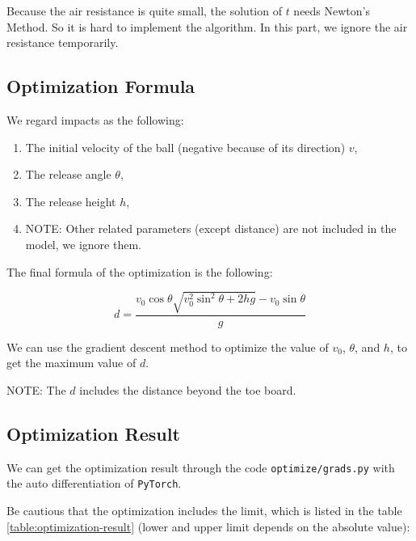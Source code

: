 \documentclass{article}
\begin{document}
Because the air resistance is quite small, the solution of $t$ needs Newton's Method. So it is hard to implement the algorithm. In this part, we ignore the air resistance temporarily.

\subsection{Optimization Formula}

\label{subsection:optimization-formula}

We regard impacts as the following:

\begin{enumerate}
    \item The initial velocity of the ball (negative because of its direction) $v$,
    \item The release angle $\theta$,
    \item The release height $h$,
    \item NOTE: Other related parameters (except distance) are not included in the model, we ignore them.
\end{enumerate}

The final formula of the optimization is the following:

\begin{equation}
    d = \dfrac{v_0\cos\theta\sqrt{v_0^2\sin^2\theta+2hg}-v_0\sin\theta}{g}
\end{equation}

We can use the gradient descent method to optimize the value of $v_0$, $\theta$, and $h$, to get the maximum value of $d$.

NOTE: The $d$ includes the distance beyond the toe board.

\subsection{Optimization Result}

\label{subsection:optimization-result}

We can get the optimization result through the code \texttt{optimize/grads.py} with the auto differentiation of \texttt{PyTorch}.

Be cautious that the optimization includes the limit, which is listed in the table \ref{table:optimization-result} (lower and upper limit depends on the absolute value):
\end{document}
